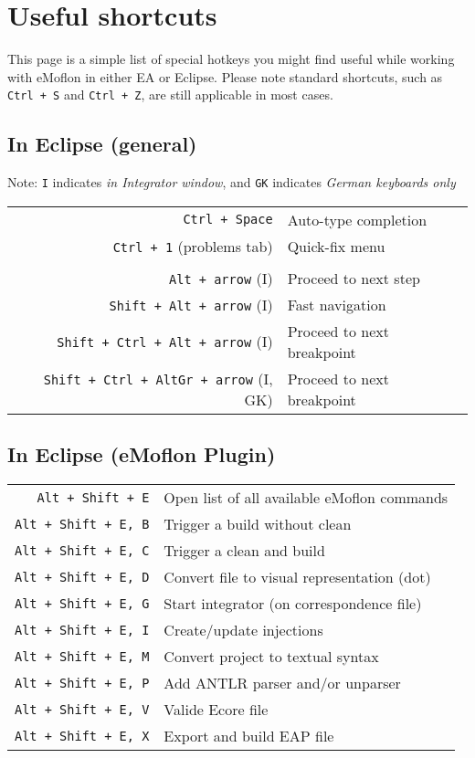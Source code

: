 \newpage
\section{Useful shortcuts}
\genHeader

This page is a simple list of special hotkeys you might find useful while working with eMoflon in either EA or Eclipse. Please note standard
shortcuts, such as \texttt{Ctrl + S} and \texttt{Ctrl + Z}, are still applicable in most cases.

\subsection{In Eclipse (general)}

{\small Note: \texttt{I} indicates \emph{in Integrator window}, and \texttt{GK} indicates \emph{German keyboards only}}

\begin{tabular}{r|l}

\texttt{Ctrl + Space} & Auto-type completion\\
\texttt{Ctrl + 1} (problems tab) & Quick-fix menu \\
\\
\texttt{Alt + arrow} (I) & Proceed to next step \\
\texttt{Shift + Alt + arrow} (I) & Fast navigation \\
\texttt{Shift + Ctrl + Alt + arrow} (I) & Proceed to next breakpoint \\
\texttt{Shift + Ctrl + AltGr + arrow} (I, GK) & Proceed to next breakpoint \\
%
\end{tabular}

\vspace{0.5cm}

\subsection{In Eclipse (eMoflon Plugin)}

\begin{tabular}{r|l}

\texttt{Alt + Shift + E} & Open list of all available eMoflon commands \\
\texttt{Alt + Shift + E, B} & Trigger a build without clean \\
\texttt{Alt + Shift + E, C} & Trigger a clean and build \\
\texttt{Alt + Shift + E, D} & Convert file to visual representation (dot)\\
\texttt{Alt + Shift + E, G} & Start integrator (on correspondence file)\\
\texttt{Alt + Shift + E, I} & Create/update injections\\
\texttt{Alt + Shift + E, M} & Convert project to textual syntax\\
\texttt{Alt + Shift + E, P} & Add ANTLR parser and/or unparser\\
\texttt{Alt + Shift + E, V} & Valide Ecore file\\
\texttt{Alt + Shift + E, X} & Export and build EAP file\\

\end{tabular}

